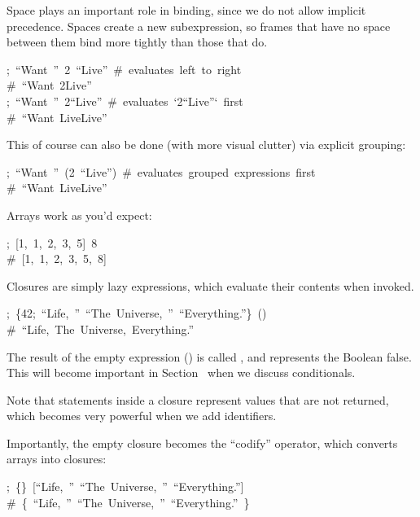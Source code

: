 \documentclass[preprint]{{acmart}}
\begin{document}
Space plays an important role in binding, since we do not allow implicit
precedence. Spaces create a new subexpression, so frames that have no
space between them bind more tightly than those that do.%
\begin{mdpre}%
\noindent;~“{Want}~”~2~“{Live}”~{\#~evaluates~left~to~right}\\
{\#~“Want~2Live”}\\
;~“{Want}~”~2“{Live}”~{\#~evaluates~`2“Live”`~first}\\
{\#~“Want~LiveLive”}%
\end{mdpre}\noindent{}This of course can also be done (with more visual clutter) via explicit grouping:
\begin{mdpre}%
\noindent;~“{Want}~”~(2~“{Live}”)~{\#~evaluates~grouped~expressions~first}\\
{\#~“Want~LiveLive”}%
\end{mdpre}\noindent{}Arrays work as you'd expect:
\begin{mdpre}%
\noindent;~{}[1,~1,~2,~3,~5]~8\\
{\#~{}[1,~1,~2,~3,~5,~8]}%
\end{mdpre}\noindent{}Closures are simply lazy expressions, which evaluate their contents when invoked.
\begin{mdpre}%
\noindent;~\{{42};~“{Life},~”~“{The}~{Universe},~”~“{Everything}.”\}~()\\
{\#~“Life,~The~Universe,~Everything.”}%
\end{mdpre}\noindent{}The result of the empty expression (\mdcode{()}) is called , and represents the Boolean false.
This will become important in Section~ when we discuss conditionals.

Note that statements inside a closure represent values that are not
returned, which becomes very powerful when we add identifiers.%

Importantly, the empty closure \mdcode{\{\}} becomes the \textquotedblleft{}codify\textquotedblright{} operator, which converts arrays
into closures:%
\begin{mdpre}%
\noindent;~\{\}~{}[“{Life},~”~“{The}~{Universe},~”~“{Everything}.”]\\
{\#~\{~“Life,~”~“The~Universe,~”~“Everything.”~\}}%
\end{mdpre}
\end{document}
